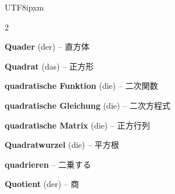 \begin{CJK}{UTF8}{ipxm}
\begin{multicols}{2}
\par\nopagebreak
\textbf{Quader} (der) -- 直方体\dotfill\hyperref[e:227]{\pageref*{e:227}}\par
\textbf{Quadrat} (das) -- 正方形\dotfill\hyperref[e:198]{\pageref*{e:198}}\par
\textbf{quadratische Funktion} (die) -- 二次関数\dotfill\hyperref[e:124]{\pageref*{e:124}}\par
\textbf{quadratische Gleichung} (die) -- 二次方程式\dotfill\hyperref[e:82]{\pageref*{e:82}}\par
\textbf{quadratische Matrix} (die) -- 正方行列\dotfill\hyperref[e:321]{\pageref*{e:321}}\par
\textbf{Quadratwurzel} (die) -- 平方根\dotfill\hyperref[e:45]{\pageref*{e:45}}\par
\textbf{quadrieren} -- 二乗する\dotfill\hyperref[e:51]{\pageref*{e:51}}\par
\textbf{Quotient} (der) -- 商\dotfill\hyperref[e:25]{\pageref*{e:25}}\par


\end{multicols}
\end{CJK}
